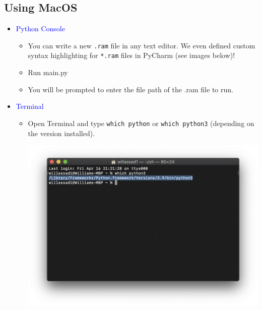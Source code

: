 \documentclass[fontsize=11pt]{article}
\newcommand{\blue}[1]{\textcolor{blue}{#1}}
\begin{document}
\subsection*{Using MacOS}
    \begin{itemize}
        \item \blue{Python Console}
        \begin{itemize}
            \item You can write a new \texttt{.ram} file in any text editor. We even defined custom syntax highlighting for \texttt{*.ram} files in PyCharm (see images below)! 
            
            \item Run main.py
            
            \item You will be prompted to enter the file path of the .ram file to run.
            
            \bigskip
            
            \bigskip
            
        \end{itemize}
        \item \blue{Terminal}
        \begin{itemize}
            \item Open Terminal and type \texttt{which python} or \texttt{which python3} (depending on the version installed).
            
            \begin{center}
                \includegraphics[scale=0.42]{terminal1.png}
            \end{center}
            

\end{itemize}
\end{itemize}
\end{document}
